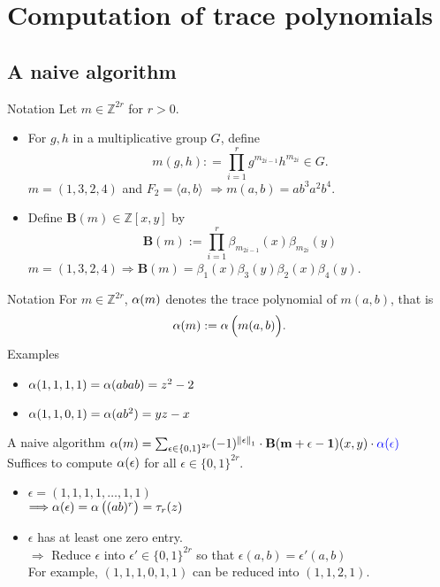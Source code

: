 \documentclass[aspectratio={169}]{beamer}
\begin{document}
\section{Computation of trace polynomials}
\subsection{A naive algorithm}
\begin{frame}{Notation}
Let $m\in \mathbb{Z}^{2r}$ for $r>0$. \\
\begin{itemize}
    \item 
For $g,h$ in a multiplicative group $G$, define 
\begin{equation*}
    m(g,h): = \prod_{i=1}^{r}{g^{m_{2i-1}} h^{m_{2i}} } \in G.
\end{equation*}
$m=(1,3,2,4)$ and $F_2=\langle a,b \rangle$ $\Longrightarrow  m(a,b)=ab^3a^2b^4$.
\vskip 0.5cm
\pause
\item
Define $\mathbf{B}(m) \in \mathbb{Z}[x,y]$ by
\begin{equation*}
 \mathbf{B}(m) := \prod_{i=1}^{r}{\beta_{m_{2i-1}}(x) \beta_{m_{2i}}(y) } 
\end{equation*}
$m=(1,3,2,4) \Longrightarrow \mathbf{B}(m)=\beta_1(x)\beta_3(y)\beta_2(x)\beta_4(y)$.
\end{itemize}
\end{frame}
\begin{frame}{Notation}
For $m \in \mathbb{Z}^{2r}$, $\operatorname{\alpha}(m)$ denotes the trace polynomial of $m(a,b)$, that is
\begin{equation*}
    \operatorname{\alpha}(m) := \operatorname{\alpha} \Big( m(a,b) \Big).
\end{equation*}
\vskip 0.5cm
Examples \\
\begin{itemize}
    \item  $\operatorname{\alpha}(1,1,1,1) = \operatorname{\alpha}(abab) = z^2-2 $
    \item  $\operatorname{\alpha}(1,1,0,1) = \operatorname{\alpha}(ab^2) = yz - x $
\end{itemize}
\end{frame}
\begin{frame}{A naive algorithm}
$\operatorname{\alpha}(m)
= \sum_{{ {\epsilon \in {\{0,1\}}^{2r}} }}(-1)^{\left\lVert\epsilon\right\rVert_1}\cdot\textbf{B}(\mathbf{\mathbf{m} + \epsilon - \mathbf{1}})(x,y)\cdot\textcolor{blue}{\operatorname{\alpha}(\epsilon)}$ \\
\vskip 0.2cm
Suffices to compute $\operatorname{\alpha}(\epsilon)$ for all $\epsilon \in { \{ {0,1 \} }^{2r}}$.
\begin{itemize}
\item $\epsilon = (1,1,1,1,\dots,1,1)$ \\
\vskip 0.3cm
$\Longrightarrow \operatorname{\alpha}(\epsilon) = \operatorname{\alpha} \big( (ab)^r \big) = \tau_r{(z)}$
\vskip 0.5cm
\item $\epsilon$ has at least one zero entry. \\
\vskip 0.3cm
$\Longrightarrow$ Reduce $\epsilon$ into $\epsilon'\in { {\{ 0,1 \}}^{2r} }$ so that $\epsilon(a,b)=\epsilon'(a,b)$\\
\vskip 0.3cm
For example, $(1,1,1,0,1,1)$ can be reduced into $(1,1,2,1)$.   
\end{itemize}
\end{frame}
\end{document}
